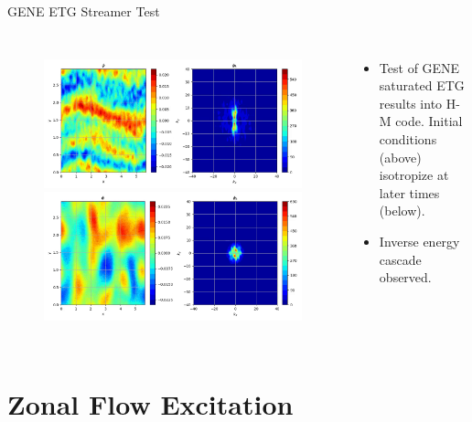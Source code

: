 \documentclass[aspectratio=43]{beamer}
\begin{document}
   \begin{frame}{GENE ETG Streamer Test}
      \begin{columns}
            \begin{figure}
               \includegraphics[height=.4\textheight,width=\textwidth]{Images/hmETG_geneInit.png}
               \includegraphics[height=.4\textheight,width=\textwidth]{Images/hmETG_geneIso.png}
            \end{figure}
            \begin{itemize}
               \item Test of GENE saturated ETG results into H-M code. Initial conditions (above) isotropize at later times (below).
               \item Inverse energy cascade observed.
            \end{itemize}
      \end{columns}
   \end{frame}

   \section{Zonal Flow Excitation}
\end{document}
